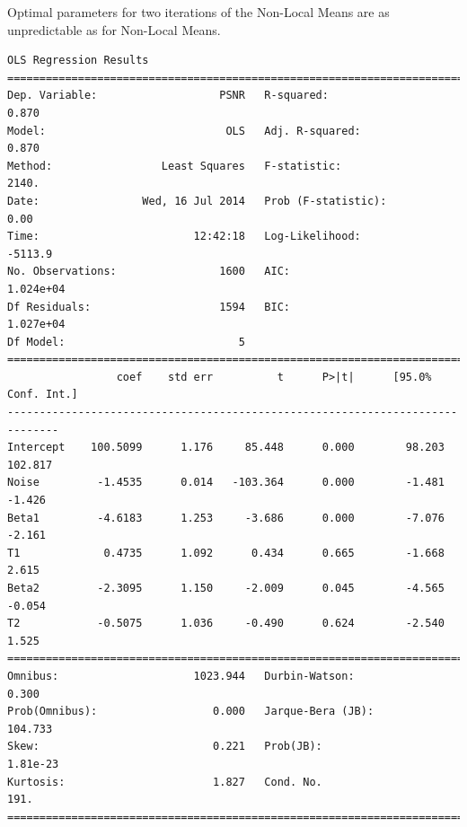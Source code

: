 \documentclass[11pt]{article}
\theoremstyle{definition}
\begin{document}
Optimal parameters for two iterations of the Non-Local Means are as unpredictable as for Non-Local Means.

{\footnotesize
\begin{lstlisting}[caption = Time Series 1 - Non-Local Means Filter 2 Iterations OLS Model, label = {multinlmeans1}]
                            OLS Regression Results                            
==============================================================================
Dep. Variable:                   PSNR   R-squared:                       0.870
Model:                            OLS   Adj. R-squared:                  0.870
Method:                 Least Squares   F-statistic:                     2140.
Date:                Wed, 16 Jul 2014   Prob (F-statistic):               0.00
Time:                        12:42:18   Log-Likelihood:                -5113.9
No. Observations:                1600   AIC:                         1.024e+04
Df Residuals:                    1594   BIC:                         1.027e+04
Df Model:                           5                                         
==============================================================================
                 coef    std err          t      P>|t|      [95.0% Conf. Int.]
------------------------------------------------------------------------------
Intercept    100.5099      1.176     85.448      0.000        98.203   102.817
Noise         -1.4535      0.014   -103.364      0.000        -1.481    -1.426
Beta1         -4.6183      1.253     -3.686      0.000        -7.076    -2.161
T1             0.4735      1.092      0.434      0.665        -1.668     2.615
Beta2         -2.3095      1.150     -2.009      0.045        -4.565    -0.054
T2            -0.5075      1.036     -0.490      0.624        -2.540     1.525
==============================================================================
Omnibus:                     1023.944   Durbin-Watson:                   0.300
Prob(Omnibus):                  0.000   Jarque-Bera (JB):              104.733
Skew:                           0.221   Prob(JB):                     1.81e-23
Kurtosis:                       1.827   Cond. No.                         191.
==============================================================================
\end{lstlisting}

}
\end{document}
